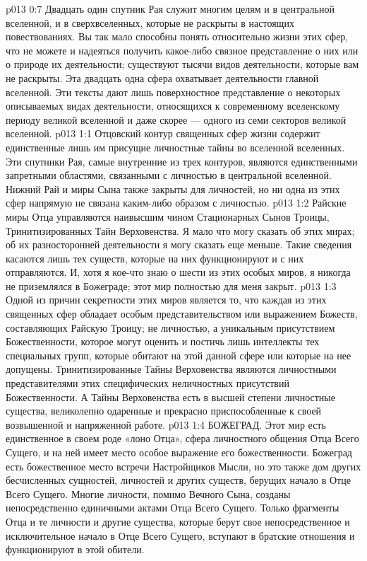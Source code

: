\vs p013 0:7 Двадцать один спутник Рая служит многим целям и в центральной вселенной, и в сверхвселенных, которые не раскрыты в настоящих повествованиях. Вы так мало способны понять относительно жизни этих сфер, что не можете и надеяться получить какое\hyp{}либо связное представление о них или о природе их деятельности; существуют тысячи видов деятельности, которые вам не раскрыты. Эта двадцать одна сфера охватывает  деятельности главной вселенной. Эти тексты дают лишь поверхностное представление о некоторых описываемых видах деятельности, относящихся к современному вселенскому периоду великой вселенной и даже скорее --- одного из семи секторов великой вселенной.
\vs p013 1:1 Отцовский контур священных сфер жизни содержит единственные лишь им присущие личностные тайны во вселенной вселенных. Эти спутники Рая, самые внутренние из трех контуров, являются единственными запретными областями, связанными с личностью в центральной вселенной. Нижний Рай и миры Сына также закрыты для личностей, но ни одна из этих сфер напрямую не связана каким\hyp{}либо образом с личностью.
\vs p013 1:2 Райские миры Отца управляются наивысшим чином Стационарных Сынов Троицы, Тринитизированных Тайн Верховенства. Я мало что могу сказать об этих мирах; об их разносторонней деятельности я могу сказать еще меньше. Такие сведения касаются лишь тех существ, которые на них функционируют и с них отправляются. И, хотя я кое\hyp{}что знаю о шести из этих особых миров, я никогда не приземлялся в Божеграде; этот мир полностью для меня закрыт.
\vs p013 1:3 Одной из причин секретности этих миров является то, что каждая из этих священных сфер обладает особым представительством или выражением Божеств, составляющих Райскую Троицу; не личностью, а уникальным присутствием Божественности, которое могут оценить и постичь лишь интеллекты тех специальных групп, которые обитают на этой данной сфере или которые на нее допущены. Тринитизированные Тайны Верховенства являются личностными представителями этих специфических неличностных присутствий Божественности. А Тайны Верховенства есть в высшей степени личностные существа, великолепно одаренные и прекрасно приспособленные к своей возвышенной и напряженной работе.
\vs p013 1:4 \bibnobreakspace БОЖЕГРАД. Этот мир есть единственное в своем роде «лоно Отца», сфера личностного общения Отца Всего Сущего, и на ней имеет место особое выражение его божественности. Божеград есть божественное место встречи Настройщиков Мысли, но это также дом других бесчисленных сущностей, личностей и других существ, берущих начало в Отце Всего Сущего. Многие личности, помимо Вечного Сына, созданы непосредственно единичными актами Отца Всего Сущего. Только фрагменты Отца и те личности и другие существа, которые берут свое непосредственное и исключительное начало в Отце Всего Сущего, вступают в братские отношения и функционируют в этой обители.
